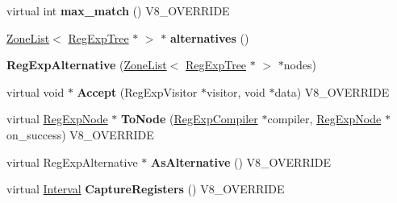 \begin{DoxyCompactItemize}
\item 
\hypertarget{classv8_1_1internal_1_1_v8___f_i_n_a_l_a0b9dd74bfd4f1172c26a072c44da8669}{}virtual int {\bfseries max\+\_\+match} () V8\+\_\+\+O\+V\+E\+R\+R\+I\+D\+E\label{classv8_1_1internal_1_1_v8___f_i_n_a_l_a0b9dd74bfd4f1172c26a072c44da8669}

\item 
\hypertarget{classv8_1_1internal_1_1_v8___f_i_n_a_l_aa8d6ef58cb6c479883371901102f84f0}{}\hyperlink{classv8_1_1internal_1_1_zone_list}{Zone\+List}$<$ \hyperlink{classv8_1_1internal_1_1_reg_exp_tree}{Reg\+Exp\+Tree} $\ast$ $>$ $\ast$ {\bfseries alternatives} ()\label{classv8_1_1internal_1_1_v8___f_i_n_a_l_aa8d6ef58cb6c479883371901102f84f0}

\item 
\hypertarget{classv8_1_1internal_1_1_v8___f_i_n_a_l_ae3c1dde8d9a669fe102cceb3db0d1e44}{}{\bfseries Reg\+Exp\+Alternative} (\hyperlink{classv8_1_1internal_1_1_zone_list}{Zone\+List}$<$ \hyperlink{classv8_1_1internal_1_1_reg_exp_tree}{Reg\+Exp\+Tree} $\ast$ $>$ $\ast$nodes)\label{classv8_1_1internal_1_1_v8___f_i_n_a_l_ae3c1dde8d9a669fe102cceb3db0d1e44}

\item 
\hypertarget{classv8_1_1internal_1_1_v8___f_i_n_a_l_a5a421cb811caf33f244ce08fe3e5ac14}{}virtual void $\ast$ {\bfseries Accept} (Reg\+Exp\+Visitor $\ast$visitor, void $\ast$data) V8\+\_\+\+O\+V\+E\+R\+R\+I\+D\+E\label{classv8_1_1internal_1_1_v8___f_i_n_a_l_a5a421cb811caf33f244ce08fe3e5ac14}

\item 
\hypertarget{classv8_1_1internal_1_1_v8___f_i_n_a_l_aa183d4adede0c6af0c092eeebf59c194}{}virtual \hyperlink{classv8_1_1internal_1_1_reg_exp_node}{Reg\+Exp\+Node} $\ast$ {\bfseries To\+Node} (\hyperlink{classv8_1_1internal_1_1_reg_exp_compiler}{Reg\+Exp\+Compiler} $\ast$compiler, \hyperlink{classv8_1_1internal_1_1_reg_exp_node}{Reg\+Exp\+Node} $\ast$on\+\_\+success) V8\+\_\+\+O\+V\+E\+R\+R\+I\+D\+E\label{classv8_1_1internal_1_1_v8___f_i_n_a_l_aa183d4adede0c6af0c092eeebf59c194}

\item 
\hypertarget{classv8_1_1internal_1_1_v8___f_i_n_a_l_a42c9f0d5726a93953d565c2ac2f1d83d}{}virtual Reg\+Exp\+Alternative $\ast$ {\bfseries As\+Alternative} () V8\+\_\+\+O\+V\+E\+R\+R\+I\+D\+E\label{classv8_1_1internal_1_1_v8___f_i_n_a_l_a42c9f0d5726a93953d565c2ac2f1d83d}

\item 
\hypertarget{classv8_1_1internal_1_1_v8___f_i_n_a_l_ac1bfb16ce46192182988ae324c15decf}{}virtual \hyperlink{classv8_1_1internal_1_1_interval}{Interval} {\bfseries Capture\+Registers} () V8\+\_\+\+O\+V\+E\+R\+R\+I\+D\+E\label{classv8_1_1internal_1_1_v8___f_i_n_a_l_ac1bfb16ce46192182988ae324c15decf}


\end{DoxyCompactItemize}
